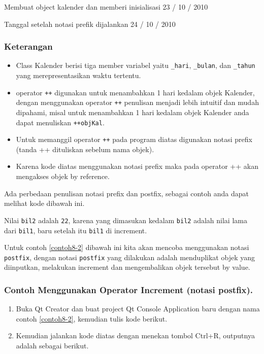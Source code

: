 \begin{lcverbatim}
Membuat object kalender dan memberi inisialisasi
23 / 10 / 2010

Tanggal setelah notasi prefik dijalankan
24 / 10 / 2010
\end{lcverbatim}

\subsubsection*{Keterangan}

\begin{itemize}

\item
 Class Kalender berisi tiga member variabel yaitu \texttt{\_hari},
 \texttt{\_bulan}, dan \texttt{\_tahun} yang merepresentasikan waktu
 tertentu.
\item
 operator \texttt{++} digunakan untuk menambahkan 1 hari kedalam objek
 Kalender, dengan menggunakan operator \texttt{++} penulisan menjadi
 lebih intuitif dan mudah dipahami, misal untuk menambahkan 1 hari
 kedalam objek Kalender anda dapat menuliskan \texttt{++objKal}.
\item
 Untuk memanggil operator \texttt{++} pada program diatas digunakan
 notasi prefix (tanda ++ dituliskan sebelum nama objek).
\item
 Karena kode diatas menggunakan notasi prefix maka pada operator ++
 akan mengakses objek by reference.
\end{itemize}

Ada perbedaan penulisan notasi prefix dan postfix, sebagai contoh anda
dapat melihat kode dibawah ini.



Nilai \texttt{bil2} adalah \texttt{22}, karena yang dimasukan kedalam
\texttt{bil2} adalah nilai lama dari \texttt{bil1}, baru setelah itu
\texttt{bil1} di increment.

Untuk contoh \ref{contoh8-2} dibawah ini kita akan mencoba menggunakan notasi
\texttt{postfix}, dengan notasi \texttt{postfix} yang dilakukan adalah
menduplikat objek yang diinputkan, melakukan increment dan mengembalikan
objek tersebut by value.

\subsubsection*{Contoh Menggunakan Operator Increment (notasi postfix).}

\begin{enumerate}

\item
 Buka Qt Creator dan buat project Qt Console Application baru dengan
 nama contoh \ref{contoh8-2}, kemudian tulis kode berikut.



\item
 Kemudian jalankan kode diatas dengan menekan tombol Ctrl+R, outputnya
 adalah sebagai berikut.
\end{enumerate}

